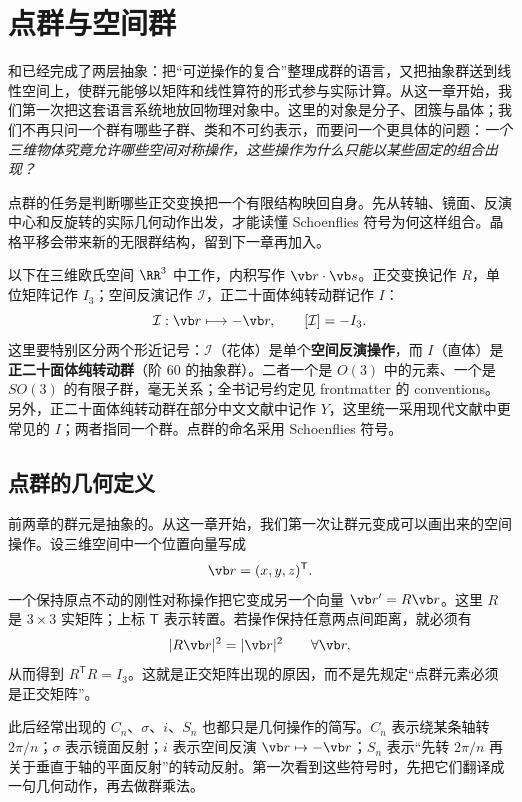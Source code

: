 \chapter{点群与空间群}
\label{chap:point-space-groups}

和已经完成了两层抽象：把“可逆操作的复合”整理成群的语言，又把抽象群送到线性空间上，使群元能够以矩阵和线性算符的形式参与实际计算。从这一章开始，我们第一次把这套语言系统地放回物理对象中。这里的对象是分子、团簇与晶体；我们不再只问一个群有哪些子群、类和不可约表示，而要问一个更具体的问题：\emph{一个三维物体究竟允许哪些空间对称操作，这些操作为什么只能以某些固定的组合出现？}

点群的任务是判断哪些正交变换把一个有限结构映回自身。先从转轴、镜面、反演中心和反旋转的实际几何动作出发，才能读懂 Schoenflies 符号为何这样组合。晶格平移会带来新的无限群结构，留到下一章再加入。

以下在三维欧氏空间 $\RR^3$ 中工作，内积写作 $\vb r\cdot\vb s$。正交变换记作 $R$，单位矩阵记作 $I_3$；空间反演记作 $\mathcal I$，正二十面体纯转动群记作 $I$：
\[
\mathcal I:\vb r\longmapsto-\vb r,
\qquad [\mathcal I]=-I_3.
\]
这里要特别区分两个形近记号：$\mathcal I$（花体）是单个\textbf{空间反演操作}，而 $I$（直体）是\textbf{正二十面体纯转动群}（阶 $60$ 的抽象群）。二者一个是 $O(3)$ 中的元素、一个是 $SO(3)$ 的有限子群，毫无关系；全书记号约定见 frontmatter 的 conventions。另外，正二十面体纯转动群在部分中文文献中记作 $Y$，这里统一采用现代文献中更常见的 $I$；两者指同一个群。点群的命名采用 Schoenflies 符号。
\section{点群的几何定义}
\label{sec:point-group-foundation}

前两章的群元是抽象的。从这一章开始，我们第一次让群元变成可以画出来的空间操作。设三维空间中一个位置向量写成
\[
\vb r=(x,y,z)^{\mathsf T}.
\]
一个保持原点不动的刚性对称操作把它变成另一个向量 $\vb r'=R\vb r$。这里 $R$ 是 $3\times3$ 实矩阵；上标 $\mathsf T$ 表示转置。若操作保持任意两点间距离，就必须有
\[
|R\vb r|^2=|\vb r|^2\qquad\forall\vb r,
\]
从而得到 $R^{\mathsf T}R=I_3$。这就是正交矩阵出现的原因，而不是先规定“点群元素必须是正交矩阵”。

此后经常出现的 $C_n$、$\sigma$、$i$、$S_n$ 也都只是几何操作的简写。$C_n$ 表示绕某条轴转 $2\pi/n$；$\sigma$ 表示镜面反射；$i$ 表示空间反演 $\vb r\mapsto-\vb r$；$S_n$ 表示“先转 $2\pi/n$ 再关于垂直于轴的平面反射”的转动反射。第一次看到这些符号时，先把它们翻译成一句几何动作，再去做群乘法。


